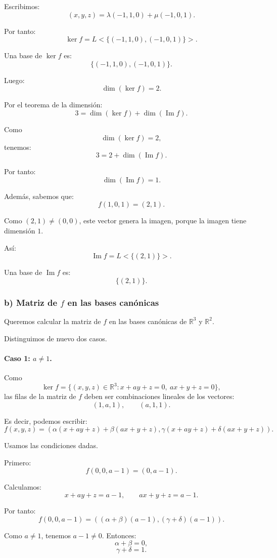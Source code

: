 \documentclass[12pt]{article}
\begin{document}
Escribimos:
\[
(x,y,z)=\lambda(-1,1,0)+\mu(-1,0,1).
\]

Por tanto:
\[
\ker f=L<\{(-1,1,0),(-1,0,1)\}>.
\]

Una base de \(\ker f\) es:
\[
\boxed{\{(-1,1,0),(-1,0,1)\}.}
\]

Luego:
\[
\boxed{\dim(\ker f)=2.}
\]

Por el teorema de la dimensión:
\[
3=\dim(\ker f)+\dim(\operatorname{Im} f).
\]

Como
\[
\dim(\ker f)=2,
\]
tenemos:
\[
3=2+\dim(\operatorname{Im} f).
\]

Por tanto:
\[
\dim(\operatorname{Im} f)=1.
\]

Además, sabemos que:
\[
f(1,0,1)=(2,1).
\]

Como \((2,1)\neq (0,0)\), este vector genera la imagen, porque la imagen tiene dimensión \(1\).

Así:
\[
\operatorname{Im} f=L<\{(2,1)\}>.
\]

Una base de \(\operatorname{Im} f\) es:
\[
\boxed{\{(2,1)\}.}
\]

\subsubsection*{b) Matriz de \(f\) en las bases canónicas}

Queremos calcular la matriz de \(f\) en las bases canónicas de \(\mathbb{R}^3\) y \(\mathbb{R}^2\).

Distinguimos de nuevo dos casos.

\paragraph{Caso 1: \(a\neq 1\).}

Como
\[
\ker f=\{(x,y,z)\in\mathbb{R}^3:x+ay+z=0,\ ax+y+z=0\},
\]
las filas de la matriz de \(f\) deben ser combinaciones lineales de los vectores:
\[
(1,a,1),
\qquad
(a,1,1).
\]

Es decir, podemos escribir:
\[
f(x,y,z)=
\left(
\alpha(x+ay+z)+\beta(ax+y+z),
\gamma(x+ay+z)+\delta(ax+y+z)
\right).
\]

Usamos las condiciones dadas.

Primero:
\[
f(0,0,a-1)=(0,a-1).
\]

Calculamos:
\[
x+ay+z=a-1,
\qquad
ax+y+z=a-1.
\]

Por tanto:
\[
f(0,0,a-1)=
\left(
(\alpha+\beta)(a-1),
(\gamma+\delta)(a-1)
\right).
\]

Como \(a\neq 1\), tenemos \(a-1\neq 0\). Entonces:
\[
\alpha+\beta=0,
\]
\[
\gamma+\delta=1.
\]
\end{document}
